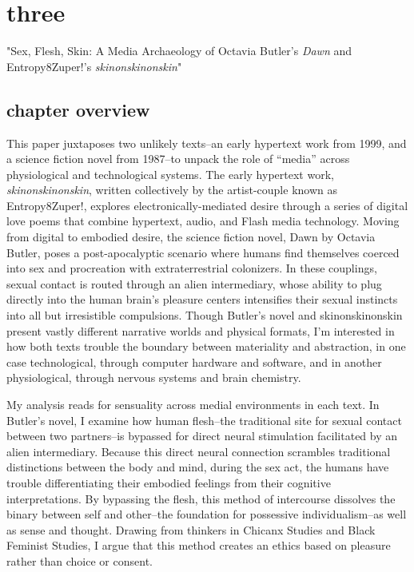 \documentclass[11pt]{article}
\author{Filipa  Calado}
\date{\today}
\title{}
\begin{document}
\tableofcontents

\section{three}
\label{sec:orge025f81}
"Sex, Flesh, Skin: A Media Archaeology of Octavia Butler's \emph{Dawn} and
Entropy8Zuper!'s \emph{skinonskinonskin}"

\subsection{chapter overview}
\label{sec:org2565273}
This paper juxtaposes two unlikely texts--an early hypertext work from
1999, and a science fiction novel from 1987--to unpack the role of
“media” across physiological and technological systems. The early
hypertext work, \emph{skinonskinonskin}, written collectively by the
artist-couple known as Entropy8Zuper!, explores
electronically-mediated desire through a series of digital love poems
that combine hypertext, audio, and Flash media technology. Moving from
digital to embodied desire, the science fiction novel, Dawn by Octavia
Butler, poses a post-apocalyptic scenario where humans find themselves
coerced into sex and procreation with extraterrestrial colonizers. In
these couplings, sexual contact is routed through an alien
intermediary, whose ability to plug directly into the human brain’s
pleasure centers intensifies their sexual instincts into all but
irresistible compulsions. Though Butler’s novel and skinonskinonskin
present vastly different narrative worlds and physical formats, I’m
interested in how both texts trouble the boundary between materiality
and abstraction, in one case technological, through computer hardware
and software, and in another physiological, through nervous systems
and brain chemistry.

My analysis reads for sensuality across medial environments in each
text. In Butler’s novel, I examine how human flesh--the traditional
site for sexual contact between two partners--is bypassed for direct
neural stimulation facilitated by an alien intermediary. Because this
direct neural connection scrambles traditional distinctions between
the body and mind, during the sex act, the humans have trouble
differentiating their embodied feelings from their cognitive
interpretations. By bypassing the flesh, this method of intercourse
dissolves the binary between self and other--the foundation for
possessive individualism--as well as sense and thought. Drawing from
thinkers in Chicanx Studies and Black Feminist Studies, I argue that
this method creates an ethics based on pleasure rather than choice or
consent.
\end{document}

